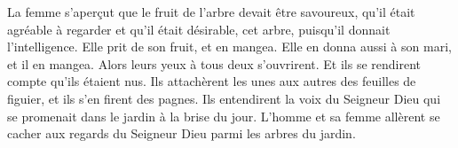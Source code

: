 La femme s’aperçut que le fruit de l’arbre devait être savoureux,
	qu’il était agréable à regarder et qu’il était désirable, cet arbre,
	puisqu’il donnait l’intelligence.
Elle prit de son fruit, et en mangea.
	Elle en donna aussi à son mari, et il en mangea.
	Alors leurs yeux à tous deux s’ouvrirent.
Et ils se rendirent compte qu’ils étaient nus.
Ils attachèrent les unes aux autres des feuilles de figuier,
	et ils s’en firent des pagnes.
Ils entendirent la voix du Seigneur Dieu
	qui se promenait dans le jardin à la brise du jour.
L’homme et sa femme allèrent se cacher aux regards du Seigneur Dieu
	parmi les arbres du jardin.
